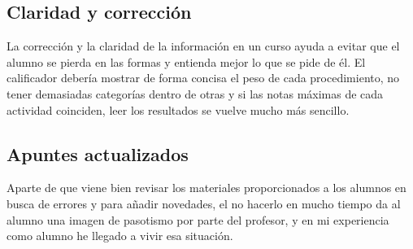 \subsection{Claridad y corrección}
La corrección y la claridad de la información en un curso ayuda a evitar que el alumno se pierda en las formas y entienda mejor lo que se pide de él.
El calificador debería mostrar de forma concisa el peso de cada procedimiento, no tener demasiadas categorías dentro de otras y si las notas máximas de cada actividad coinciden, leer los resultados se vuelve mucho más sencillo.

\subsection{Apuntes actualizados}
Aparte de que viene bien revisar los materiales proporcionados a los alumnos en busca de errores y para añadir novedades, el no hacerlo en mucho tiempo da al alumno una imagen de pasotismo por parte del profesor, y en mi experiencia como alumno he llegado a vivir esa situación.